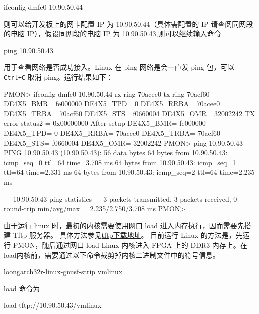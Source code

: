 \begin{CodeBlock}[language=BookShell]
ifconfig dmfe0 10.90.50.44
\end{CodeBlock}

则可以给开发板上的网卡配置 IP 为 10.90.50.44（具体需配置的 IP 请查阅同网段的电脑 IP），假设同网段的电脑 IP 为 10.90.50.43,则可以继续输入命令

\begin{CodeBlock}[language=BookShell]
ping 10.90.50.43
\end{CodeBlock}

用于查看网络是否成功接入。Linux 在 ping 网络是会一直发 ping 包，可以 \texttt{Ctrl+C} 取消 ping。运行结果如下：

\begin{CodeBlock}[language=BookText]
PMON> ifconfig dmfe0 10.90.50.44
rx ring 70acee0
tx ring 70acf60
DE4X5_BMR= fe000000
DE4X5_TPD= 0
DE4X5_RRBA= 70acee0
DE4X5_TRBA= 70acf60
DE4X5_STS= f0660004
DE4X5_OMR= 32002242
TX error status2 = 0x00000000
After setup
DE4X5_BMR= fe000000
DE4X5_TPD= 0
DE4X5_RRBA= 70acee0
DE4X5_TRBA= 70acf60
DE4X5_STS= f0660004
DE4X5_OMR= 32002242
PMON> ping 10.90.50.43
PING 10.90.50.43 (10.90.50.43): 56 data bytes
64 bytes from 10.90.50.43: icmp_seq=0 ttl=64 time=3.708 ms
64 bytes from 10.90.50.43: icmp_seq=1 ttl=64 time=2.331 ms
64 bytes from 10.90.50.43: icmp_seq=2 ttl=64 time=2.235 ms

--- 10.90.50.43 ping statistics ---
3 packets transmitted, 3 packets received, 0%
round-trip min/avg/max = 2.235/2.750/3.708 ms
PMON>
\end{CodeBlock}

由于运行 linux 时，最初的内核需要使用网口 load 进入内存执行，因而需要先搭建 Tftp 服务器。
具体方法参见\href{https://gitee.com/chenzes/chiplab-tools/releases/download/chiplab-tools/tftp.zip}{tftp下载地址}。
目前运行 Linux 的方法是，先运行 PMON，随后通过网口 load Linux 内核进入 FPGA 上的 DDR3 内存上。在load内核前，需要通过以下命令裁剪掉内核二进制文件中的符号信息。

\begin{CodeBlock}[language=BookShell]
loongarch32r-linux-gnusf-strip vmlinux
\end{CodeBlock}

load 命令为

\begin{CodeBlock}[language=BookShell]
load tftp://10.90.50.43/vmlinux
\end{CodeBlock}

